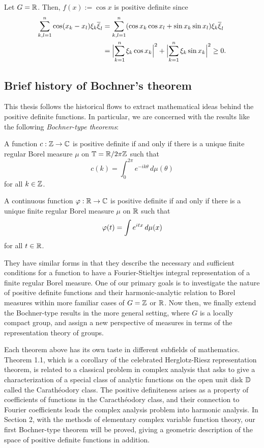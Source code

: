 \documentclass[a4paper]{article}
\begin{document}
\begin{ex}
Let $G=\R$.
Then, $f(x):=\cos x$ is positive definite since
\begin{align*}
\sum_{k,l=1}^n\cos(x_k-x_l)\xi_k\bar\xi_l
&=\sum_{k,l=1}^n(\cos x_k\cos x_l+\sin x_k\sin x_l)\xi_k\bar\xi_l\\
&=\Bigl|\sum_{k=1}^n\xi_k\cos x_k\Bigr|^2+\Bigl|\sum_{k=1}^n\xi_k\sin x_k\Bigr|^2\ge0.
\end{align*}
\end{ex}


\subsection{Brief history of Bochner's theorem}

This thesis follows the historical flows to extract mathematical ideas behind the positive definite functions.
In particular, we are concerned with the results like the following \emph{Bochner-type theorems}:
\begin{thm}
A function $c:\Z\to\C$ is positive definite if and only if there is a unique finite regular Borel measure $\mu$ on $\T=\R/2\pi\Z$ such that
\[c(k)=\int_0^{2\pi}e^{-ik\theta}\,d\mu(\theta)\]
for all $k\in\Z$.
\end{thm}
\begin{thm}
A continuous function $\f:\R\to\C$ is positive definite if and only if there is a unique finite regular Borel measure $\mu$ on $\R$ such that
\[\f(t)=\int e^{itx}\,d\mu(x)\]
for all $t\in\R$.
\end{thm}
They have similar forms in that they describe the necessary and sufficient conditions for a function to have a Fourier-Stieltjes integral representation of a finite regular Borel measure.
One of our primary goals is to investigate the nature of positive definite functions and their harmonic-analytic relation to Borel measures within more familiar cases of $G=\Z$ or $\R$.
Now then, we finally extend the Bochner-type results in the more general setting, where $G$ is a locally compact group, and assign a new perspective of measures in terms of the representation theory of groups.

Each theorem above has its own taste in different subfields of mathematics.
Theorem 1.1, which is a corollary of the celebrated Herglotz-Riesz representation theorem, is related to a classical problem in complex analysis that asks to give a characterization of a special class of analytic functions on the open unit disk $\D$ called the Carath\'eodory class.
The positive definiteness arises as a property of coefficients of functions in the Caracth\'eodory class, and their connection to Fourier coefficients leads the complex analysis problem into harmonic analysis.
In Section 2, with the methods of elementary complex variable function theory, our first Bochner-type theorem will be proved, giving a geometric description of the space of positive definite functions in addition.
\end{document}

